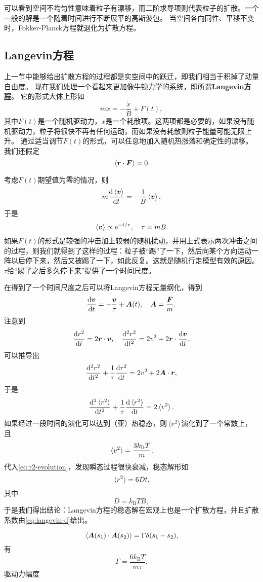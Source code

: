 \documentclass[hyperref, UTF8, a4paper]{ctexart}
\newcommand*{\ee}{\mathrm{e}}
\newcommand{\concept}[1]{\underline{\textbf{#1}}}
\begin{document}
可以看到空间不均匀性意味着粒子有漂移，而二阶求导项则代表粒子的扩散。一个一般的解是一个随着时间进行不断展平的高斯波包。
当空间各向同性、平移不变时，Fokker-Planck方程就退化为扩散方程。

\subsection{Langevin方程}

上一节中能够给出扩散方程的过程都是实空间中的跃迁，即我们相当于积掉了动量自由度。
现在我们处理一个看起来更加像牛顿力学的系统，即所谓\concept{Langevin方程}。
它的形式大体上形如
\begin{equation}
    m \ddot{x} = - \frac{\dot{x}}{B} + F(t),
\end{equation}
其中$F(t)$是一个随机驱动力，$\dot{x}$是一个耗散项。这两项都是必要的，如果没有随机驱动力，粒子将很快不再有任何运动，而如果没有耗散则粒子能量可能无限上升。
通过适当调节$F(t)$的形式，可以任意地加入随机热涨落和确定性的漂移。
我们还假定
\begin{equation}
    \expval*{\vb*{r} \cdot \vb*{F}} = 0.
\end{equation}

考虑$F(t)$期望值为零的情况，则
\[
    m \dv{\expval*{\vb*{v}}}{t} = - \frac{1}{B} \expval*{\vb*{v}},
\]
于是
\begin{equation}
    \expval*{\vb*{v}} \propto \ee^{-t / \tau}, \quad \tau = mB.
\end{equation}
如果$F(t)$的形式是较强的冲击加上较弱的随机扰动，并用上式表示两次冲击之间的过程，则我们就得到了这样的过程：粒子被“踢”了一下，然后向某个方向运动一阵以后停下来，然后又被踢了一下，如此反复。这就是随机行走模型有效的原因。
$\tau$给“踢了之后多久停下来”提供了一个时间尺度。

在得到了一个时间尺度之后可以将Langevin方程无量纲化，得到
\begin{equation}
    \dv{\vb*{v}}{t} = - \frac{\vb*{v}}{\tau} + \vb*{A}(t), \quad \vb*{A} = \frac{\vb*{F}}{m}.
\end{equation}
注意到
\[
    \dv{r^2}{t} = 2 \vb*{r} \cdot \vb*{v}, \quad \dv[2]{r^2}{t} = 2 v^2 + 2 \vb*{r} \cdot \dv{\vb*{v}}{t},
\]
可以推导出
\[
    \dv[2]{r^2}{t} + \frac{1}{\tau} \dv{r^2}{t} = 2 v^2 + 2 \vb*{A} \cdot \vb*{r},
\]
于是
\begin{equation}
    \dv[2]{\expval*{r^2}}{t} + \frac{1}{\tau} \dv{\expval*{r^2}}{t} = 2 \expval*{v^2}.
    \label{eq:r2-evolution}
\end{equation}
如果经过一段时间的演化可以达到（亚）热稳态，则$\expval*{v^2}$演化到了一个常数上，且
\[
    \expval*{v^2} = \frac{3 k_\text{B} T}{m},
\]
代入\eqref{eq:r2-evolution}，发现瞬态过程很快衰减，稳态解形如
\[
    \expval*{r^2} = 6 D t,
\]
其中
\begin{equation}
    D = k_\text{B} T B,
    \label{eq:langevin-d}
\end{equation}
于是我们得出结论：Langevin方程的稳态解在宏观上也是一个扩散方程，并且扩散系数由\eqref{eq:langevin-d}给出。

\begin{equation}
    \expval*{\vb*{A}(s_1) \cdot \vb*{A}(s_2)} = \Gamma \delta(s_1 - s_2),
\end{equation}
有
\begin{equation}
    \Gamma = \frac{6 k_\text{B} T}{m \tau}.
\end{equation}
驱动力幅度
\end{document}
